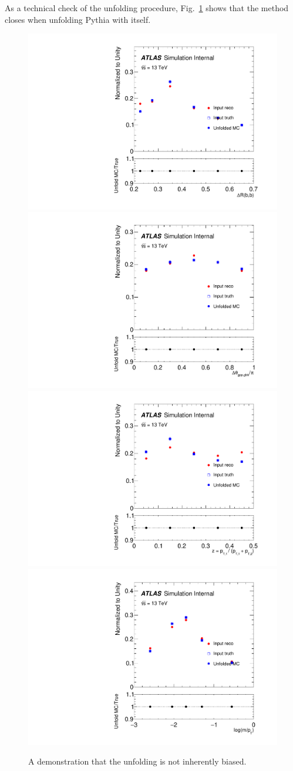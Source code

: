 
\label{app:gbb-unfolding:technicalclosure}

As a technical check of the unfolding procedure, Fig.~\ref{fig:gbb-technicalclosure} shows that the method closes when unfolding Pythia with itself.

\begin{figure}[htpb!]
\begin{center}
  \includegraphics[width=0.4\linewidth]{figures/gbb/Unfolding/dR_technical_closure.pdf}
  \includegraphics[width=0.4\linewidth]{figures/gbb/Unfolding/dphi_technical_closure.pdf}
  \includegraphics[width=0.4\linewidth]{figures/gbb/Unfolding/ZpT_technical_closure.pdf}
  \includegraphics[width=0.4\linewidth]{figures/gbb/Unfolding/fracmasspt_technical_closure.pdf}
\caption[]{A demonstration that the unfolding is not inherently biased.} 
\label{fig:gbb-technicalclosure}
\end{center}
\end{figure}

